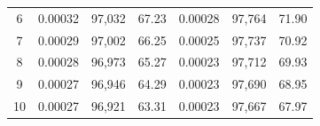 \begin{tabular}{cccc|ccc}
6    & 0.00032                                                          & 97,032                                                                                            & 67.23                                                                                                                      & 0.00028                                                          & 97,764                                                                                            & 71.90                                                                                                                      \\
7    & 0.00029                                                          & 97,002                                                                                            & 66.25                                                                                                                      & 0.00025                                                          & 97,737                                                                                            & 70.92                                                                                                                      \\
8    & 0.00028                                                          & 96,973                                                                                            & 65.27                                                                                                                      & 0.00023                                                          & 97,712                                                                                            & 69.93                                                                                                                      \\
9    & 0.00027                                                          & 96,946                                                                                            & 64.29                                                                                                                      & 0.00023                                                          & 97,690                                                                                            & 68.95                                                                                                                      \\
10   & 0.00027                                                          & 96,921                                                                                            & 63.31                                                                                                                      & 0.00023                                                          & 97,667                                                                                            & 67.97                                                                                                                      \\

\end{tabular}
